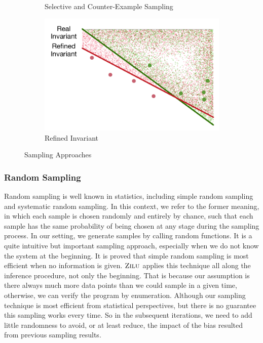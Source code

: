 \begin{figure}[!h]
\begin{subfigure}{0.23\textwidth}
        \caption{Selective and Counter-Example Sampling}
        \label{fig:sampling:selective}
    \end{subfigure}
    \begin{subfigure}{0.23\textwidth}
        \centering
        \includegraphics[scale=0.3]{figures/general-sampling-3.pdf}
        \caption{Refined Invariant}
        \label{fig:sampling:selective:invariant}
    \end{subfigure}
    \caption{Sampling Approaches}
    \label{fig:sampling}
\end{figure}


\subsubsection{Random Sampling}
Random sampling is well known in statistics, including simple random sampling and systematic random sampling.
In this context, we refer to the former meaning, in which each sample is chosen randomly and entirely by chance, 
such that each sample has the same probability of being chosen at any stage during the sampling process.
In our setting, we generate samples by calling random functions.
It is a quite intuitive but important sampling approach, especially when we do not know the system at the beginning. 
It is proved that simple random sampling is most efficient when no information is given.
$\textsc{Zilu}$ applies this technique all along the inference procedure, not only the beginning. 
That is because our assumption is there always much more data points than we could sample in a given time,
otherwise, we can verify the program by enumeration.
Although our sampling technique is most efficient from statistical perspectives, 
but there is no guarantee this sampling works every time.
So in the subsequent iterations, we need to add little randomness to avoid, or at least reduce, 
the impact of the bias resulted from previous sampling results.


